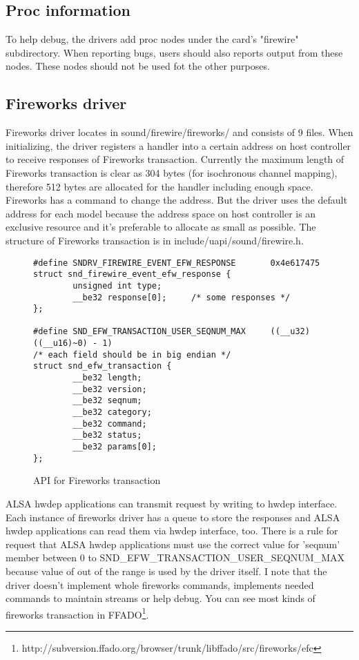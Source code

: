 \documentclass[onecolumn]{article}
\begin{document}
\subsection{Proc information}

To help debug, the drivers add proc nodes under the card's "firewire" subdirectory. When reporting bugs, users should also reports output from these nodes. These nodes should not be used fot the other purposes.


\subsection{Fireworks driver}

Fireworks driver locates in sound/firewire/fireworks/ and consists of 9 files. When initializing, the driver registers a handler into a certain address on host controller to receive responses of Fireworks transaction. Currently the maximum length of Fireworks transaction is clear as 304 bytes (for isochronous channel mapping), therefore 512 bytes are allocated for the handler including enough space. Fireworks has a command to change the address. But the driver uses the default address for each model because the address space on host controller is an exclusive resource and it's preferable to allocate as small as possible. The structure of Fireworks transaction is in include/uapi/sound/firewire.h.

\begin{figure}[H]
\small
\begin{verbatim}
#define SNDRV_FIREWIRE_EVENT_EFW_RESPONSE       0x4e617475
struct snd_firewire_event_efw_response {
        unsigned int type;
        __be32 response[0];     /* some responses */
};

#define SND_EFW_TRANSACTION_USER_SEQNUM_MAX     ((__u32)((__u16)~0) - 1)
/* each field should be in big endian */
struct snd_efw_transaction {
        __be32 length;
        __be32 version;
        __be32 seqnum;
        __be32 category;
        __be32 command;
        __be32 status;
        __be32 params[0];
};
\end{verbatim}
\caption{API for Fireworks transaction}
\label{uapi-fireworks-transaction}
\end{figure}

ALSA hwdep applications can transmit request by writing to hwdep interface. Each instance of fireworks driver has a queue to store the responses and ALSA hwdep applications can read them via hwdep interface, too. There is a rule for request that ALSA hwdep applications must use the correct value for 'seqnum' member between 0 to SND\_EFW\_TRANSACTION\_USER\_SEQNUM\_MAX because value of out of the range is used by the driver itself. I note that the driver doesn't implement whole fireworks commands, implements needed commands to maintain streams or help debug. You can see most kinds of fireworks transaction in FFADO\footnote{http://subversion.ffado.org/browser/trunk/libffado/src/fireworks/efc}.
\end{document}
